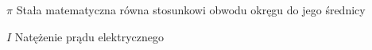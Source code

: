\chapter*{\acronymstitle}
\pagestyle{plain}
$\pi$
\hspace{1cm}
Stała matematyczna równa stosunkowi obwodu okręgu do jego średnicy

\ensuremath{I}
\hspace{1cm}
Natężenie prądu elektrycznego
